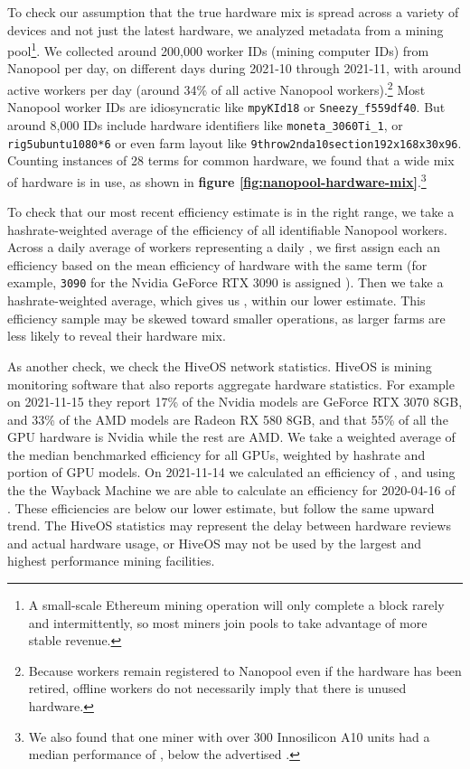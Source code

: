 To check our assumption that the true hardware mix is spread across a variety of devices and not just the latest hardware, we analyzed metadata from a mining pool\footnote{A small-scale Ethereum mining operation will only complete a block rarely and intermittently, so most miners join pools to take advantage of more stable revenue.}. We collected around 200,000 worker IDs (mining computer IDs) from Nanopool\cite{nanopool_nanopool_2021} per day, on  different days during 2021-10 through 2021-11, with around  active workers per day (around 34\% of all active Nanopool workers).\footnote{Because workers remain registered to Nanopool even if the hardware has been retired, offline workers do not necessarily imply that there is unused hardware.} Most Nanopool worker IDs are idiosyncratic like \texttt{mpyKId18} or \texttt{Sneezy\_f559df40}. But around 8,000 IDs include hardware identifiers like \texttt{moneta\_3060Ti\_1}, or \texttt{rig5ubuntu1080*6} or even farm layout like \texttt{9throw2nda10section192x168x30x96}. Counting instances of 28 terms for common hardware, we found that a wide mix of hardware is in use, as shown in \textbf{figure \ref{fig:nanopool-hardware-mix}}.\footnote{We also found that one miner\cite{nanopool_0xa8b6_2021} with over 300 Innosilicon A10\cite{innosilicon_innosilicon_2021} units had a median performance of , below the advertised .}

To check that our most recent efficiency estimate is in the right range, we take a hashrate-weighted average of the efficiency of all identifiable Nanopool workers. Across a daily average of  workers representing a daily , we first assign each an efficiency based on the mean efficiency of hardware with the same term (for example, \texttt{3090} for the Nvidia GeForce RTX 3090 is assigned ). Then we take a hashrate-weighted average, which gives us , within our lower estimate. This efficiency sample may be skewed toward smaller operations, as larger farms are less likely to reveal their hardware mix.

As another check, we check the HiveOS\cite{hive_os_hive_2021} network statistics. HiveOS is mining monitoring software that also reports aggregate hardware statistics. For example on 2021-11-15 they report 17\% of the Nvidia models are GeForce RTX 3070 8GB, and 33\% of the AMD models are Radeon RX 580 8GB, and that 55\% of all the GPU hardware is Nvidia while the rest are AMD. We take a weighted average of the median benchmarked efficiency for all GPUs, weighted by hashrate and portion of GPU models. On 2021-11-14 we calculated an efficiency of , and using the the Wayback Machine\cite{hive_os_wayback_2020} we are able to calculate an efficiency for 2020-04-16 of . These efficiencies are below our lower estimate, but follow the same upward trend. The HiveOS statistics may represent the delay between hardware reviews and actual hardware usage, or HiveOS may not be used by the largest and highest performance mining facilities.

